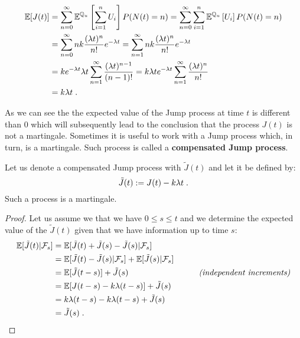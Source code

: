 \documentclass[times, utf8, diplomski]{fer}
\begin{document}
		\begin{equation}
		\begin{split}
			\mathbb{E}[J(t)] &= \sum_{n=0}^{\infty}\mathbb{E}^{\mathbb{Q}_u} \left[ \sum_{i=1}^{n} U_i \right] P(N(t)=n) = \sum_{n=0}^{\infty}\sum_{i=1}^{n} \mathbb{E}^{\mathbb{Q}_u}\left[U_i\right] P(N(t)=n) \\
			&= \sum_{n=0}^{\infty} nk\frac{(\lambda t)^n}{n!}e^{-\lambda t} = \sum_{n=1}^{\infty} nk\frac{(\lambda t)^n}{n!}e^{-\lambda t} \\
			&= ke^{-\lambda t}\lambda t\sum_{n=1}^{\infty}\frac{(\lambda t)^{n-1}}{(n-1)!} = k\lambda te^{-\lambda t}\sum_{n=1}^{\infty}\frac{(\lambda t)^n}{n!} \\
			&= k\lambda t \hspace{0.1cm}.
		\end{split}
		\end{equation}

		\noindent As we can see the the expected value of the Jump process at time $t$ is different than $0$ which will subsequently lead to the conclusion that the process $J(t)$ is not a martingale. Sometimes it is useful to work with a Jump process which, in turn, is a martingale. Such process is called a \textbf{compensated Jump process}. 
		
		\vspace{2cm}

		\begin{proposition} Let us denote a compensated Jump process with $\tilde{J}(t)$ and let it be defined by:
			\begin{equation}
			\tilde{J}(t) := J(t) - k\lambda t \hspace{0.1cm}.
			\end{equation}
			Such a process is a martingale.
		\end{proposition}
		\begin{proof}
			Let us assume we that we have $0 \leq s \leq t$ and we determine the expected value of the $\tilde{J}(t)$ given that we have information up to time $s$:
			\begin{align*}
				\mathbb{E}[\tilde{J}(t)|\mathcal{F}_s] &= \mathbb{E}[\tilde{J}(t) + \tilde{J}(s) - \tilde{J}(s)|\mathcal{F}_s] \\
				&= \mathbb{E}[\tilde{J}(t) - \tilde{J}(s)|\mathcal{F}_s] + \mathbb{E}[\tilde{J}(s)|\mathcal{F}_s] \\
				&= \mathbb{E}[\tilde{J}(t - s)] + \tilde{J}(s) \hspace{3cm} \mbox{\textit{(independent increments)}} \\
				&= \mathbb{E}[J(t - s) - k\lambda (t-s)] + \tilde{J}(s)\\
				&= k\lambda (t-s) - k\lambda (t-s) + \tilde{J}(s) \\
				&= \tilde{J}(s)  \hspace{0.1cm}.
			\end{align*}
		\end{proof}
\end{document}
